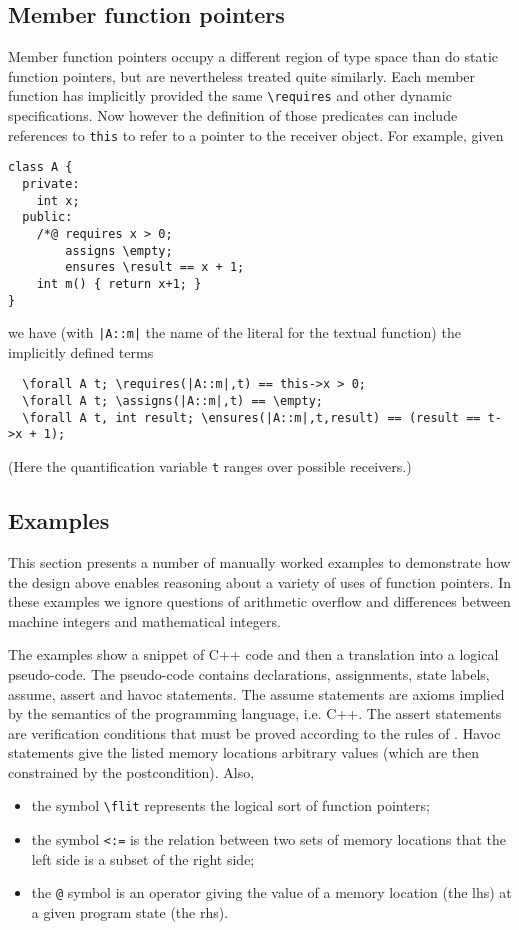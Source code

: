 {\begin{itemize}
\end{itemize}

\subsection{Member function pointers}
\label{sec:memberfp}
Member function pointers occupy a different region of type space than do static function pointers, but are nevertheless treated quite
similarly. Each member function has implicitly provided the same \lstinline|\requires| and other dynamic specifications. Now however the definition of those predicates can include references to \lstinline|this| to refer to a pointer to the receiver object. For example, given
\begin{lstlisting}
class A {
  private:
    int x;
  public:
    /*@ requires x > 0;
        assigns \empty;
        ensures \result == x + 1;
    int m() { return x+1; }
}
\end{lstlisting}
we have (with \lstinline+|A::m|+ the name of the literal for the textual function) the implicitly defined terms
\begin{lstlisting}
  \forall A t; \requires(|A::m|,t) == this->x > 0;
  \forall A t; \assigns(|A::m|,t) == \empty;
  \forall A t, int result; \ensures(|A::m|,t,result) == (result == t->x + 1);
\end{lstlisting}
(Here the quantification variable \lstinline|t| ranges over possible receivers.)

\subsection{Examples}
\label{sec:fpexamples}

This section presents a number of manually worked examples 
to demonstrate how the design above enables reasoning about
a variety of uses of function pointers.
In these examples we ignore questions of arithmetic overflow and 
differences between machine integers and mathematical integers.

The examples show a snippet of C++ code and then a translation into a logical
pseudo-code. The pseudo-code contains declarations, assignments, state labels, assume, assert and havoc statements. 
The assume statements are axioms implied by the semantics of the
programming language, i.e. C++. 
The assert statements are verification conditions that
must be proved according to the rules of \NAME.
Havoc statements give the listed memory locations arbitrary values (which are then constrained by the postcondition). Also,
\begin{itemize}[noitemsep,nolistsep]
	\item the symbol \lstinline|\flit| represents the logical sort of function pointers;
	\item the symbol \lstinline|<:=| is the relation between two sets of memory locations that the left side is a subset of the right side;
	\item the \lstinline|@| symbol is an operator giving the value of a memory location (the lhs) at a given program state (the rhs).
\end{itemize}

}
